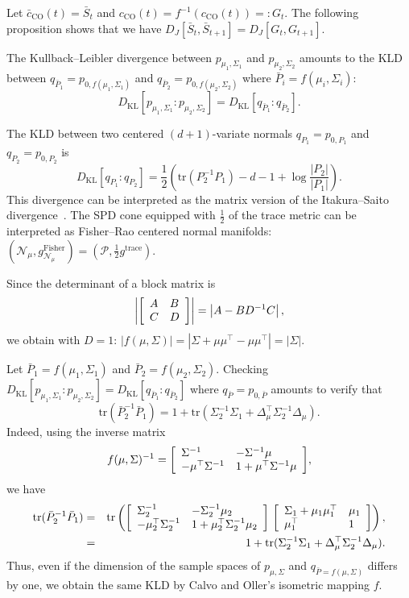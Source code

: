 \documentclass[entropy,article,accept,oneauthor,pdftex,entropy]{Definitions/mdpi}
\def\trace{\mathrm{trace}}
\def\CO{\mathrm{CO}}
\def\KL{\mathrm{KL}}
\def\Fisher{\mathrm{Fisher}}
\def\mattwotwo#1#2#3#4{{\left[\begin{array}{ll}#1 & #2\cr #3 & #4\end{array}\right]}}
\def\tr{\mathrm{tr}}
\def\calN{\mathcal{N}}
\def\calP{\mathcal{P}}
\def\barP{{\bar P}}
\begin{document}
Let $\bar c_\CO(t)=\bar S_t$ and $c_\CO(t)=f^{-1}(c_\CO(t))=:G_t$.
The following proposition shows that we have $D_J[\bar S_t,\bar S_{t+1}]=D_J[G_t,G_{t+1}]$.

\begin{Proposition}\label{prop:KL}
The Kullback–Leibler divergence   between 
$p_{\mu_1,\Sigma_1}$ and $p_{\mu_2,\Sigma_2}$ amounts to the KLD
between $q_{\bar P_1}=p_{0,f(\mu_1,\Sigma_1)}$ and $q_{\bar P_2}=p_{0,f(\mu_2,\Sigma_2)}$ where $\bar P_i=f(\mu_i,\Sigma_i)$:
$$
D_\KL[p_{\mu_1,\Sigma_1}:p_{\mu_2,\Sigma_2}]=D_\KL[q_{\bar P_1}:q_{\bar P_2}].
$$
\end{Proposition}





The KLD between two centered $(d+1)$-variate normals $q_{P_1}=p_{0,P_1}$ and $q_{P_2}=p_{0,P_2}$ is
$$
D_\KL[q_{P_1}:q_{P_2}]
=\frac{1}{2}\left(
\tr(P_2^{-1}P_1)-d-1+\log\frac{|P_2|}{|P_1|}
\right).$$
This divergence can be interpreted as the matrix version of the Itakura–Saito divergence~\cite{davis2006differential}.
The SPD cone equipped with $\frac{1}{2}$ of the trace metric can be interpreted as Fisher–Rao centered normal manifolds: 
$(\calN_\mu,g^\Fisher_{\calN_\mu})=(\calP,\frac{1}{2}g^\trace)$.

Since the determinant of a block matrix is
$$
\left|\mattwotwo{A}{B}{C}{D}\right|=\left|A-BD^{-1}C\right|,
$$
 we obtain with $D=1$: $|f(\mu,\Sigma)| = |\Sigma+\mu\mu^\top-\mu\mu^\top|=|\Sigma|$.

Let $\bar P_1=f(\mu_1,\Sigma_1)$ and 
$\bar P_2=f(\mu_2,\Sigma_2)$.
Checking $D_\KL[p_{\mu_1,\Sigma_1}:p_{\mu_2,\Sigma_2}]=D_\KL[q_{\bar P_1}:q_{\bar P_2}]$ where $q_{\barP}=p_{0,\barP}$ amounts to verify that
$$
\tr(\bar P_2^{-1}\bar P_1)=1+\tr(\Sigma_2^{-1}\Sigma_1+\Delta_\mu^\top\Sigma_2^{-1}\Delta_\mu).
$$
Indeed, using the inverse matrix  
$$f(\mu,\Sigma)^{-1}=
\mattwotwo{\Sigma^{-1}}{-\Sigma^{-1}\mu}{-\mu^\top\Sigma^{-1}}{1+\mu^\top \Sigma^{-1}\mu}
,$$
we have 
\begin{eqnarray*}
\tr(\bar P_2^{-1}\bar P_1)&=&\tr\left(
\mattwotwo{\Sigma^{-1}_2}{-\Sigma^{-1}_2\mu_2}{-\mu_2^\top\Sigma_2^{-1}}{1+\mu_2^\top \Sigma^{-1}_2\mu_2}\ \mattwotwo{\Sigma_1+\mu_1\mu_1^\top}{\mu_1}{\mu_1^\top}{1}
\right),\\
&=& 1+\tr(\Sigma_2^{-1}\Sigma_1+\Delta_\mu^\top\Sigma_2^{-1}\Delta_\mu).
\end{eqnarray*}
Thus, even if the dimension of the sample spaces of $p_{\mu,\Sigma}$ and $q_{\barP=f(\mu,\Sigma)}$ differs by one, we obtain the same KLD by Calvo and Oller's isometric mapping $f$.
 
\end{document}
